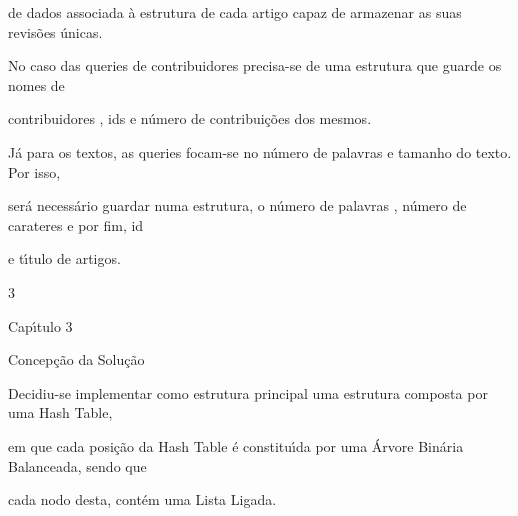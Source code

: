 \documentclass[a4paper,portrait,12pt]{article}
\begin{document}
\begin{flushleft}
de dados associada à estrutura de cada artigo capaz de armazenar as suas revisões únicas.
\end{flushleft}


\begin{flushleft}
No caso das queries de contribuidores precisa-se de uma estrutura que guarde os nomes de
\end{flushleft}


\begin{flushleft}
contribuidores , ids e número de contribuições dos mesmos.
\end{flushleft}


\begin{flushleft}
Já para os textos, as queries focam-se no número de palavras e tamanho do texto. Por isso,
\end{flushleft}


\begin{flushleft}
será necessário guardar numa estrutura, o número de palavras , número de carateres e por fim, id
\end{flushleft}


\begin{flushleft}
e t\i{}́tulo de artigos.
\end{flushleft}





3





\begin{flushleft}
\newpage
Cap\i{}́tulo 3
\end{flushleft}





\begin{flushleft}
Concepção da Solução
\end{flushleft}


\begin{flushleft}
Decidiu-se implementar como estrutura principal uma estrutura composta por uma Hash Table,
\end{flushleft}


\begin{flushleft}
em que cada posição da Hash Table é constitu\i{}́da por uma Árvore Binária Balanceada, sendo que
\end{flushleft}


\begin{flushleft}
cada nodo desta, contém uma Lista Ligada.
\end{flushleft}
\end{document}
